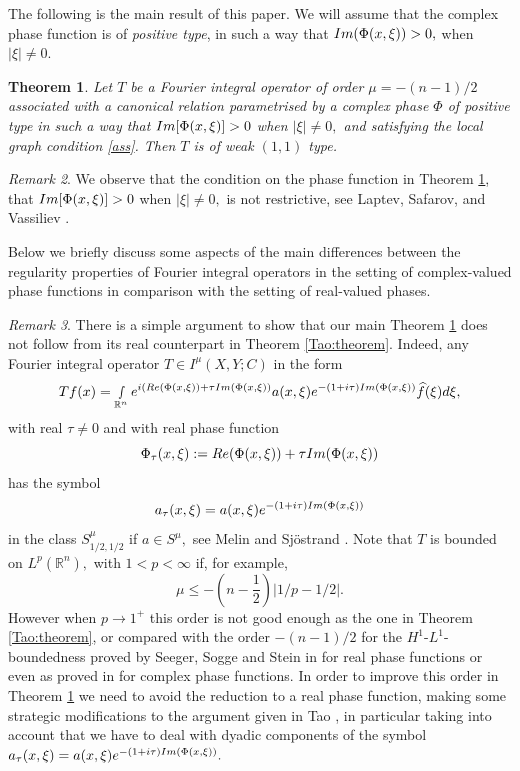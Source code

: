 \documentclass[12pt, reqno]{amsart}
\newtheorem{theorem}{Theorem}[section]
\theoremstyle{definition}
\theoremstyle{remark}
\newtheorem{remark}[theorem]{Remark}
\numberwithin{equation}{section}
\begin{document}
The following is the main result of this paper. We will assume that the complex phase function is of {\it positive type}, in such a way that $\textnormal{Im}(\Phi(x,\xi))> 0,$ when $|\xi|\neq 0.$
\begin{theorem}\label{Main:theorem} Let $T$ be a Fourier integral operator of order $\mu=-(n-1)/2$ associated with a canonical relation parametrised by a complex phase $\Phi$  of positive type in such a way that $\textnormal{Im}[\Phi(x,\xi)]>0$ when $|\xi|\neq 0,$ and satisfying the local graph condition \eqref{ass}. Then $T$ is of weak $(1,1)$ type.
\end{theorem}
\begin{remark}
    We observe that the condition on the phase function in Theorem \ref{Main:theorem}, that $\textnormal{Im}[\Phi(x,\xi)]>0$ when $|\xi|\neq 0,$ is not restrictive,  see Laptev, Safarov, and Vassiliev \cite{Laptev:Safarov:Vassiliev}.
\end{remark}
Below we briefly discuss some aspects of the main differences between the regularity properties of Fourier integral operators in the setting of complex-valued phase functions in comparison with the setting of real-valued phases.
\begin{remark} There is a simple argument to show that our main Theorem \ref{Main:theorem} does not follow from its real counterpart  in Theorem \ref{Tao:theorem}. Indeed, any Fourier integral operator $T\in I^\mu(X,Y;C)$ in the form
\begin{equation}
  Tf(x)= \smallint\limits_{\mathbb{R}^n}e^{i(\textnormal{Re}(\Phi(x,\xi))+\tau \textnormal{Im}(\Phi(x,\xi) )}a(x,\xi)e^{-(1+i\tau)\textnormal{Im}(\Phi(x,\xi) )}\widehat{f}(\xi)d\xi ,
\end{equation}with real $\tau\neq0$ and with real phase function $$\Phi_{\tau}(x,\xi):=\textnormal{Re}(\Phi(x,\xi))+\tau \textnormal{Im}(\Phi(x,\xi) )$$ has the symbol
$$ a_\tau(x,\xi)= a(x,\xi)e^{-(1+i\tau)\textnormal{Im}(\Phi(x,\xi) )}$$
in the class $S^{\mu}_{1/2,1/2}$ if $a\in S^\mu,$ see Melin and Sj\"ostrand \cite[Page 394]{Melin:Sjostrand1976}.  Note that $T$ is bounded on $L^p(\mathbb{R}^n),$ with $1<p<\infty$ if, for example,  $$\mu\leq -\left(n-\frac{1}{2}\right)|1/p-1/2|.$$
However when $p\rightarrow 1^{+}$ this order is not good enough as the one in Theorem \ref{Tao:theorem}, or compared with the order $-(n-1)/2$ for the $H^1$-$L^1$-boundedness  proved by Seeger, Sogge and Stein in \cite{SSS} for real phase functions or even as proved in \cite{Ruzhansky:CWI-book} for complex phase functions.
In order to improve this order in Theorem  \ref{Main:theorem} we need to avoid the reduction to a real phase function, making some strategic modifications to the argument given in Tao \cite{Tao}, in particular taking into account that we have to deal with dyadic components of the symbol $a_\tau(x,\xi)= a(x,\xi)e^{-(1+i\tau)\textnormal{Im}(\Phi(x,\xi) )}.$ 
\end{remark}
\end{document}
